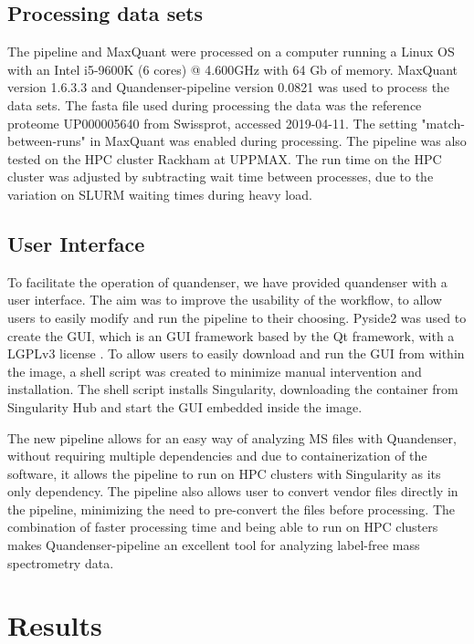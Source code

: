 \documentclass[11pt]{article}
\begin{document}
\subsection*{Processing data sets}
The pipeline and MaxQuant were processed on a computer running a Linux OS with an Intel i5-9600K (6 cores) @ 4.600GHz with 64 Gb of memory. MaxQuant version 1.6.3.3 and Quandenser-pipeline version 0.0821 was used to process the data sets. The fasta file used during processing the data was the reference proteome UP000005640 from Swissprot, accessed 2019-04-11. The setting "match-between-runs" in MaxQuant was enabled during processing. The pipeline was also tested on the HPC cluster Rackham at UPPMAX. The run time on the HPC cluster was adjusted by subtracting wait time between processes, due to the variation on SLURM waiting times during heavy load.


\subsection*{User Interface}
To facilitate the operation of quandenser, we have provided quandenser with a user interface. The aim was to improve the usability of the workflow, to allow users to easily modify and run the pipeline to their choosing. Pyside2 was used to create the GUI, which is an GUI framework based by the Qt framework, with a LGPLv3 license \cite{pyside2}. To allow users to easily download and run the GUI from within the image, a shell script was created to minimize manual intervention and installation. The shell script installs Singularity, downloading the container from Singularity Hub and start the GUI embedded inside the image.

The new pipeline allows for an easy way of analyzing MS files with Quandenser, without requiring multiple dependencies and due to containerization of the software, it allows the pipeline to run on HPC clusters with Singularity as its only dependency. The pipeline also allows user to convert vendor files directly in the pipeline, minimizing the need to pre-convert the files before processing. The combination of faster processing time and being able to run on HPC clusters makes Quandenser-pipeline an excellent tool for analyzing label-free mass spectrometry data.

\section*{Results}
\end{document}
